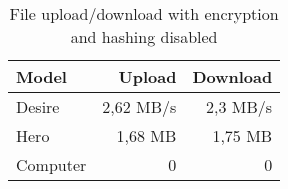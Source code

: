 \begin{table}
  \centering
  \caption{File upload/download with encryption and hashing disabled}
  \begin{tabular}{ | l | r | r |}
    \hline
    \textbf{Model}    &   \textbf{Upload}  &   \textbf{Download}   \\ \hline
    Desire & 2,62 MB/s & 2,3 MB/s \\ \hline
    Hero & 1,68 MB & 1,75 MB \\ \hline
    Computer & 0 & 0 \\ \hline
  \end{tabular}
  \label{tbl:files:unencrypted}
\end{table}
